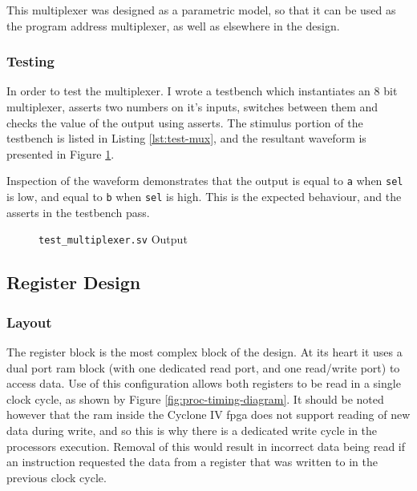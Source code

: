 This multiplexer was designed as a parametric model, so that it can be used as the program address multiplexer, as well as elsewhere in the design.


\subsubsection{Testing}
In order to test the multiplexer. I wrote a testbench which instantiates an $8$ bit multiplexer, asserts two numbers on it's inputs, switches between them and checks the value of the output using asserts. The stimulus portion of the testbench is listed in Listing \ref{lst:test-mux}, and the resultant waveform is presented in Figure \ref{fig:test-mux}.

Inspection of the waveform demonstrates that the output is equal to \texttt{a}  when \texttt{sel} is low, and equal to \texttt{b} when \texttt{sel} is high. This is the expected behaviour, and the asserts in the testbench pass.




\begin{figure}[ht]
	\centering
	
	\caption{\texttt{test\_multiplexer.sv} Output}
	\label{fig:test-mux}
\end{figure}

\subsection{Register Design}
\subsubsection{Layout}

The register block is the most complex block of the design. At its heart it uses a dual port \gls{ram} block (with one dedicated read port, and one read/write port) to access data. Use of this configuration allows both registers to be read in a single clock cycle, as shown by Figure \ref{fig:proc-timing-diagram}. It should be noted however that the \gls{ram} inside the Cyclone IV \gls{fpga} does not support reading of new data during write, and so this is why there is a dedicated write cycle in the processors execution. Removal of this would result in incorrect data being read if an instruction requested the data from a register that was written to in the previous clock cycle.

